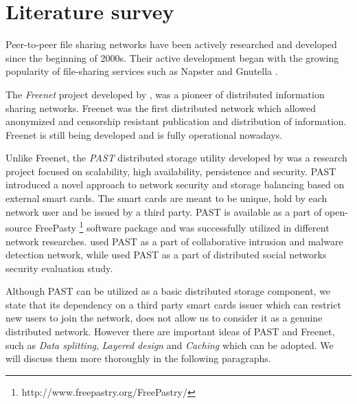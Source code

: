 \section{Literature survey}

Peer-to-peer file sharing networks have been actively researched and
developed since the beginning of 2000s. Their active development began
with the growing popularity of file-sharing services such as Napster
\citep{napster} and Gnutella \citep{gnutella}.

The \emph{Freenet} project developed by \citet{freenet}, was
a pioneer of distributed information sharing networks.
Freenet was the first distributed network which allowed anonymized
and censorship resistant publication and distribution of information.
Freenet is still being developed and is fully operational nowadays.

Unlike Freenet, the \emph{PAST} distributed storage utility
developed by \citet{past} was a research project focused
on scalability, high availability, persistence
and security. PAST introduced a novel approach to \pp network
security and storage balancing based on external smart cards.
The smart cards are meant to be unique, hold by each network
user and be issued by a third party.
PAST is available as a part of open-source FreePasty
\footnote{http://www.freepastry.org/FreePastry/} software package
and was successfully utilized in different \pp network researches.
\citet{p2p-intrusion} used PAST as a part of \pp collaborative
intrusion and malware detection network, while
\citet{p2p-social-security} used PAST as a part of distributed
social networks security evaluation study.

Although PAST can be utilized as a basic distributed storage
component, we state that its dependency on a third party smart
cards issuer which can restrict new users to join the network,
does not allow us to consider it as a genuine distributed network.
However there are important ideas of PAST and Freenet, such as
\emph{Data splitting}, \emph{Layered design} and \emph{Caching}
which can be adopted. We will discuss them more thoroughly
in the following paragraphs.


